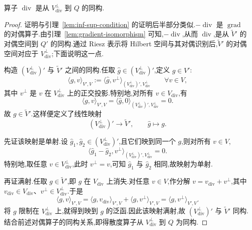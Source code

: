 \begin{lemma}[散度算子的同构性质]\label{lem:divergence-isomorphism}
算子 $\operatorname{div}$ 是从 $V_{\mathrm{div}}^{\perp}$ 到 $Q$ 的同构.
\end{lemma}
\begin{proof}
证明与引理~\ref{lem:inf-sup-condition} 的证明后半部分类似.$-\operatorname{div}$ 是 $\operatorname{grad}$ 的对偶算子.由引理~\ref{lem:gradient-isomorphism} 可知,$-\operatorname{div}$,从而 $\operatorname{div}$,是从 $\widetilde V'$ 的对偶空间到 $Q'$ 的同构.通过 Riesz 表示将 Hilbert 空间与其对偶识别后,$\widetilde V'$ 的对偶空间对应于 $V_{\mathrm{div}}^{\perp}$;下面说明这一点.

构造 $(V_{\mathrm{div}}^{\perp})'$ 与 $\widetilde V'$ 之间的同构.任取 $\widehat g\in(V_{\mathrm{div}}^{\perp})'$,定义 $g\in V'$:
\[
  \langle g,v\rangle_{V',V}
    :=\langle\widehat g,v^{\perp}\rangle_{(V_{\mathrm{div}}^{\perp})',V_{\mathrm{div}}^{\perp}}
    \qquad\forall v\in V,
\]
其中 $v^{\perp}$ 是 $v$ 在 $V_{\mathrm{div}}^{\perp}$ 上的正交投影.特别地,对所有 $v\in V_{\mathrm{div}}$,有
\[
  \langle g,v\rangle_{V',V}
    =\langle\widehat g,0\rangle_{(V_{\mathrm{div}}^{\perp})',V_{\mathrm{div}}^{\perp}}=0.
\]
故 $g\in\widetilde V'$.这样便定义了线性映射
\[
  (V_{\mathrm{div}}^{\perp})'\longrightarrow\widetilde V',
  \qquad \widehat g\longmapsto g.
\]

先证该映射是单射.设 $\widehat g_1,\widehat g_2\in(V_{\mathrm{div}}^{\perp})'$,且它们映到同一个 $g$,则对所有 $v\in V$,
\[
  \langle\widehat g_1-\widehat g_2,v^{\perp}\rangle_{(V_{\mathrm{div}}^{\perp})',V_{\mathrm{div}}^{\perp}}=0.
\]
特别地,取任意 $v\in V_{\mathrm{div}}^{\perp}$,此时 $v^{\perp}=v$,可知 $\widehat g_1$ 与 $\widehat g_2$ 相同,故映射为单射.

再证满射.任取 $g\in\widetilde V'$,即 $g$ 在 $V_{\mathrm{div}}$ 上消失.对任意 $v\in V$,作分解 $v=v_{\mathrm{div}}+v^{\perp}$,其中 $v_{\mathrm{div}}\in V_{\mathrm{div}}$、$v^{\perp}\in V_{\mathrm{div}}^{\perp}$.于是
\[
  \langle g,v\rangle_{V',V}
    =\langle g,v_{\mathrm{div}}\rangle_{V',V}
      +\langle g,v^{\perp}\rangle_{V',V}
    =\langle g,v^{\perp}\rangle_{V',V}.
\]
将 $g$ 限制在 $V_{\mathrm{div}}^{\perp}$ 上,就得到映到 $g$ 的泛函.因此该映射满射,故 $(V_{\mathrm{div}}^{\perp})'$ 与 $\widetilde V'$ 同构.结合前述对偶算子的同构关系,即得散度算子从 $V_{\mathrm{div}}^{\perp}$ 到 $Q$ 为同构.
\end{proof}


